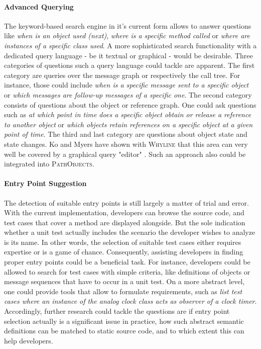 \paragraph{Advanced Querying} The keyword-based search engine in it's current form allows to answer questions like \textit{when is an object used (next)}, \textit{where is a specific method called} or \textit{where are instances of a specific class used}.
A more sophisticated search functionality with a dedicated query language - be it textual or graphical - would be desirable.
Three categories of questions such a query language could tackle are apparent.
The first category are queries over the message graph or respectively the call tree.
For instance, those could include \textit{when is a specific message sent to a specific object} or \textit{which messages are follow-up messages of a specific one}.
The second category consists of questions about the object or reference graph.
One could ask questions such as \textit{at which point in time does a specific object obtain or release a reference to another object} or \textit{which objects retain references on a specific object at a given point of time}.
The third and last category are questions about object state and state changes.
Ko and Myers have shown with \textsc{Whyline} that this area can very well be covered by a graphical query "editor" \cite{ko_debugging_2008}.
Such an approach also could be integrated into \textsc{PathObjects}.

\paragraph{Entry Point Suggestion} The detection of suitable entry points is still largely a matter of trial and error.
With the current implementation, developers can browse the source code, and test cases that cover a method are displayed alongside.
But the sole indication whether a unit test actually includes the scenario the developer wishes to analyze is its name.
In other words, the selection of suitable test cases either requires expertise or is a game of chance.
Consequently, assisting developers in finding proper entry points could be a beneficial task.
For instance, developers could be allowed to search for test cases with simple criteria, like definitions of objects or message sequences that have to occur in a unit test.
On a more abstract level, one could provide tools that allow to formulate requirements, such as \textit{list test cases where an instance of the analog clock class acts as observer of a clock timer}.
Accordingly, further research could tackle the questions are if entry point selection actually is a significant issue in practice, how such abstract semantic definitions can be matched to static source code, and to which extent this can help developers.
